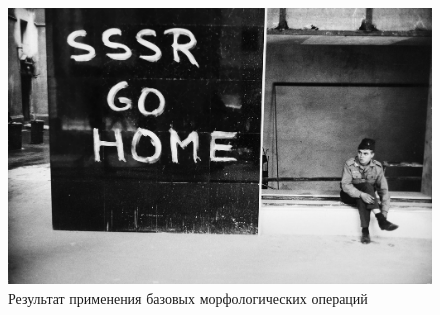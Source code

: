 \begin{figure}[ht!]
    \centering
    \includegraphics[width=\textwidth]{images/transformed_images/1/4 try/Result.jpg}
    \caption{Результат применения базовых морфологических операций}
    \label{img:Soldier_result}
\end{figure} 

